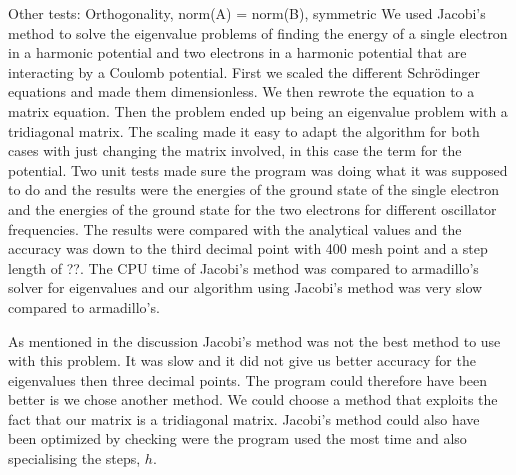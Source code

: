 Other tests: Orthogonality, norm(A) = norm(B), symmetric
We used Jacobi's method to solve the eigenvalue problems of finding the energy of a single electron in a harmonic potential and two electrons in a harmonic potential that are interacting by a Coulomb potential. First we scaled the different Schrödinger equations and made them dimensionless. We then rewrote the equation to a matrix equation. Then the problem ended up being an eigenvalue problem with a tridiagonal matrix. The scaling made it easy to adapt the algorithm for both cases  with just changing the matrix involved, in this case the term for the potential. Two unit tests made sure the program was doing what it was supposed to do and the results were the energies of the ground state of the single electron and the energies of the ground state for the two electrons for different oscillator frequencies. The results were compared with the analytical values and the accuracy was down to the third decimal point with 400 mesh point and a step length of ??. The CPU time of Jacobi's method was compared to armadillo's solver for eigenvalues and our algorithm using Jacobi's method was very slow compared to armadillo's. 

As mentioned in the discussion Jacobi's method was not the best method to use with this problem. It was slow and it did not give us better accuracy for the eigenvalues then three decimal points. The program could therefore have been better is we chose another method. We could choose a method that exploits the fact that our matrix is a tridiagonal matrix. Jacobi's method could also have been optimized by checking were the program used the most time and also specialising the steps, $h$.


